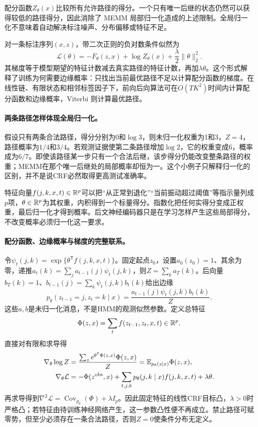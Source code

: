 配分函数$Z_\theta(x)$比较所有允许路径的得分。一个只有唯一后继的状态仍然可以获得较低的路径得分，因此消除了 MEMM 局部归一化造成的上述限制。全局归一化不意味着自动解决标注噪声、分布偏移或特征不足。

对一条标注序列$(x,z)$，带二次正则的负对数条件似然为
\begin{equation}
 \mathcal L(\theta)=-F_\theta(z,x)+\log Z_\theta(x)
 +\frac{\lambda}{2}\|\theta\|_2^2.
\end{equation}
其梯度等于模型期望的特征计数减去真实路径的特征计数，再加$\lambda\theta$。这个形式解释了训练为何需要边缘概率：只找出当前最优路径不足以计算配分函数的梯度。在线性链、有限状态和相邻标签因子下，前向后向算法可在$O(TK^2)$时间内计算配分函数和边缘概率，Viterbi 则计算最优路径。

\paragraph{两条路径怎样体现全局归一化。}
假设只有两条合法路径，得分分别为0和$\log3$，则未归一化权重为1和3，$Z=4$，路径概率为$1/4$和$3/4$。若观测证据使第二条路径增加$\log2$，它的权重变成6，概率成为$6/7$。即使该路径某一步只有一个合法后继，该步得分仍能改变整条路径的权重；MEMM在那个唯一后继处的局部概率却恒为一。这个小例子只解释归一化的区别，并不是说CRF必然取得更高测试准确率。

特征向量$f(j,k,x,t)\in\mathbb{R}^p$可以把“从正常到退化”“当前振动超过阈值”等指示量列成$p$项，$\theta\in\mathbb{R}^p$为其权重，内积得到一个标量得分。指数化把任何实得分变成正权重，最后归一化才得到概率。后文神经编码器只是在学习怎样产生这些局部得分，不改变概率必须归一化这一要求。

\paragraph{配分函数、边缘概率与梯度的完整联系。}
令$\psi_t(j,k)=\exp\{\theta^{\mathsf T}f(j,k,x,t)\}$。固定起点$z_0$，设置$a_0(z_0)=1$、其余为零，递推$a_t(k)=\sum_ja_{t-1}(j)\psi_t(j,k)$，则$Z=\sum_ka_T(k)$。后向量$b_T(k)=1$、$b_{t-1}(j)=\sum_k\psi_t(j,k)b_t(k)$给出边缘
\begin{equation}
 p_\theta(z_{t-1}=j,z_t=k\mid x)
 =\frac{a_{t-1}(j)\psi_t(j,k)b_t(k)}{Z}.
\end{equation}
这些$a,b$是未归一化消息，不是HMM的观测似然参数。定义总特征
\begin{equation}
 \Phi(z,x)=\sum_tf(z_{t-1},z_t,x,t)\in\mathbb{R}^p.
\end{equation}
直接对有限和求导得
\begin{align}
 \nabla_\theta\log Z
 &=\frac{\sum_z e^{\theta^{\mathsf T}\Phi(z,x)}\Phi(z,x)}{Z}
 =\mathbb{E}_{p_\theta(z\mid x)}\Phi(z,x),\\
 \nabla_\theta\mathcal L
 &=-\Phi(z^{\rm obs},x)+\sum_{t,j,k}p_\theta(j,k\mid x)f(j,k,x,t)+\lambda\theta.
\end{align}
再求导得到$\nabla^2\mathcal L=\operatorname{Cov}_{p_\theta}(\Phi)+\lambda I_p$。因此固定特征的线性CRF目标凸，$\lambda>0$时严格凸；若特征由待训练神经网络产生，这一参数凸性便不再成立。禁止路径可赋零势，但至少必须存在一条合法路径，否则$Z=0$使条件分布无定义。

